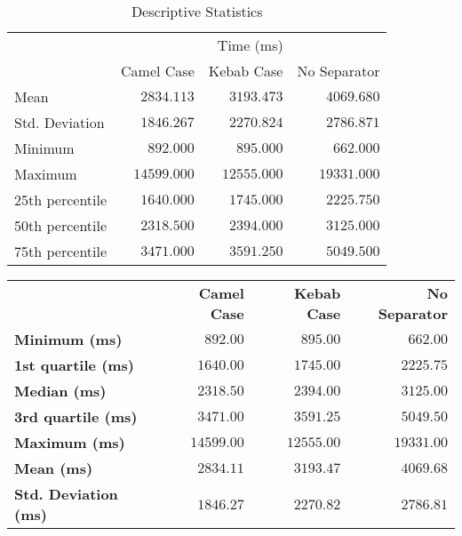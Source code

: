 \documentclass[]{article}
\begin{document}
\begin{table}[h]
	\centering
	\caption{Descriptive Statistics}
	\label{tab:descriptiveStatistics}
	{
		\begin{tabular}{lrrr}
			\toprule
			\multicolumn{1}{c}{} & \multicolumn{3}{c}{Time (ms)} \\
			\cline{2-4}
			 & Camel Case & Kebab Case & No Separator  \\
			\cmidrule[0.4pt]{1-4}
			Mean & $2834.113$ & $3193.473$ & $4069.680$  \\
			Std. Deviation & $1846.267$ & $2270.824$ & $2786.871$  \\
			Minimum & $892.000$ & $895.000$ & $662.000$  \\
			Maximum & $14599.000$ & $12555.000$ & $19331.000$  \\
			25th percentile & $1640.000$ & $1745.000$ & $2225.750$  \\
			50th percentile & $2318.500$ & $2394.000$ & $3125.000$  \\
			75th percentile & $3471.000$ & $3591.250$ & $5049.500$  \\
			\bottomrule
		\end{tabular}
	}
\end{table}

\begin{table}[h]
	\centering
	\label{tab:descriptiveStatistics}
	{
		\begin{tabular}{lrrr}
			\toprule
			\multicolumn{1}{c}{} & \textbf{Camel Case} & \textbf{Kebab Case} & \textbf{No Separator} \\
			\cmidrule(lr{.75em}){2-4}
			\textbf{Minimum (ms)} & $892.00$ & $895.00$ & $662.00$  \\
			\textbf{1st quartile (ms)} & $1640.00$ & $1745.00$ & $2225.75$  \\
			\textbf{Median (ms)} & $2318.50$ & $2394.00$ & $3125.00$  \\
			\textbf{3rd quartile (ms)} & $3471.00$ & $3591.25$ & $5049.50$  \\
			\textbf{Maximum (ms)} & $14599.00$ & $12555.00$ & $19331.00$  \\
			\textbf{Mean (ms)} & $2834.11$ & $3193.47$ & $4069.68$  \\
			\textbf{Std. Deviation (ms)} & $1846.27$ & $2270.82$ & $2786.81$  \\
			
			
			
			
			
			\bottomrule
		\end{tabular}
	}
\end{table}
\end{document}
